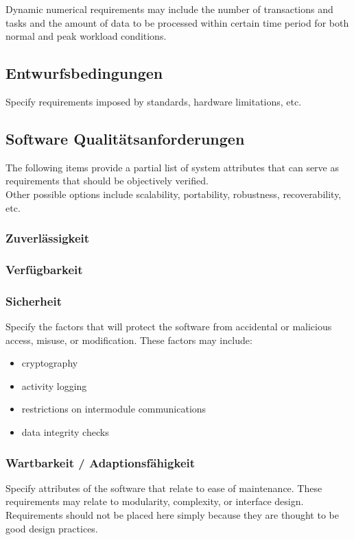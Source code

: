 \noindent Dynamic numerical requirements may include the number of transactions and tasks and the amount of data to be processed within certain time period for both normal and peak workload conditions.

\subsection{Entwurfsbedingungen}
Specify requirements imposed by standards, hardware limitations, etc.

\subsection{Software Qualitätsanforderungen}
The following items provide a partial list of system attributes that can serve as requirements that should be objectively verified. \\[0.1cm]
Other possible options include scalability, portability, robustness, recoverability, etc.

\subsubsection{Zuverlässigkeit}

\subsubsection{Verfügbarkeit}

\subsubsection{Sicherheit}
Specify the factors that will protect the software from accidental or malicious access, misuse, or modification. These factors may include:
\begin{itemize}
	\item cryptography
	\item activity logging
	\item restrictions on intermodule communications
	\item data integrity checks
\end{itemize}

\subsubsection{Wartbarkeit / Adaptionsfähigkeit}
Specify attributes of the software that relate to ease of maintenance. These requirements may relate to modularity, complexity, or interface design. Requirements should not be placed here simply because they are thought to be good design practices.


